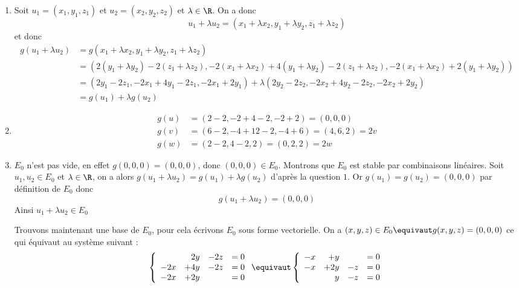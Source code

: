 \documentclass[a4paper, 11pt,reqno]{article}
\begin{document}
\begin{correction}
\begin{enumerate}

\item 
Soit $u_1= (x_1,y_1,z_1) $ et  $u_2= (x_2,y_2,z_2) $ et $\lambda \in \R$. On a donc 
$$u_1 +\lambda u_2 = (x_1+\lambda x_2,y_1+\lambda y_2 ,z_1+\lambda z_2)$$
et donc 
\begin{align*}
g(u_1+\lambda u_2) & = g  (x_1+\lambda x_2,y_1+\lambda y_2 ,z_1+\lambda z_2)\\
								&= (2(y_1 +\lambda y_2) - 2 (z_1+ \lambda z_2),  -2 (x_1 +\lambda x_2) + 4 (y_1 +\lambda y_2) - 2 (z_1 +\lambda z_2), -2 (x_1 +\lambda x_2) +2 (y_1 +\lambda y_2))\\
								&= (2y_1-2z_1, -2x_1 +4y_1-2z_1, -2x_1+2y_1) +\lambda  (2y_2-2z_2, -2x_2 +4y_2-2z_2, -2x_2+2y_2) \\
								&= g(u_1)+\lambda g(u_2)
\end{align*}

\item 

\begin{align*}
g(u)&= (2-2,-2+4-2, -2+2) =(0,0,0)\\
g(v)&=(6-2, -4+12-2, -4+6) = (4,6,2)=2v\\
g(w)&=(2-2, 4-2, 2) = (0,2,2) =2w
\end{align*}

\item $E_0$ n'est pas vide, en effet $g(0,0,0) = (0,0,0)$, donc $(0,0,0) \in E_0$.
Montrons que $E_0$ est stable par combinaisons linéaires. Soit $u_1, u_2\in E_0$ et $\lambda \in \R$, on a  alors $g(u_1+\lambda u_2) = g(u_1) + \lambda g(u_2) $ d'après la question $1$. Or $g(u_1) =g(u_2) = (0,0,0)$ par définition de $E_0$ donc 
$$g(u_1+\lambda u_2) =(0,0,0)$$
Ainsi $u_1+\lambda u_2 \in E_0$ 


Trouvons maintenant une base de $E_0$, pour cela écrivons $E_0$ sous forme vectorielle. 
On a $(x,y,z) \in E_0 \equivaut g(x,y,z)=(0,0,0)$ ce qui équivaut au système suivant :
$$\left\{ 
\begin{array}{rrrc}
&2y&-2z&=0\\
-2x&+4y&-2z&=0\\
-2x&+2y& &=0
\end{array}
\right. \equivaut
\left\{ 
\begin{array}{rrrc}
-x&+y& &=0\\
-x&+2y&-z&=0\\
&y&-z&=0
\end{array}
\right. 
 $$
 

\end{enumerate}
\end{correction}
\end{document}
